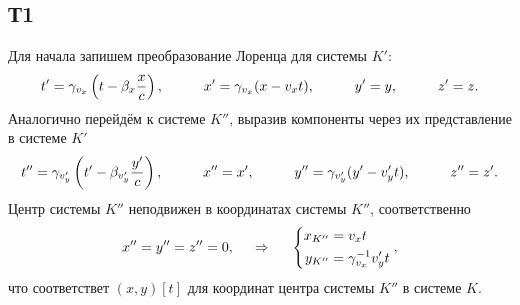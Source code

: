 \subsection*{Т1}

Для начала запишем преобразование Лоренца для системы $K'$:
\begin{equation*}
    t' = \gamma_{v_x} \left(t - \beta_x \frac{x}{c}\right)
    , \hspace{1 cm}
    x' = \gamma_{v_x} (x - v_x t)
    , \hspace{1 cm}
    y' = y
    , \hspace{1 cm}
    z' = z.
\end{equation*}
Аналогично перейдём к системе $K''$, выразив компоненты через их представление в системе $K'$
\begin{equation*}
    t'' = \gamma_{v_y'} \left(t' - \beta_{v_y'} \frac{y'}{c}\right),
    \hspace{1 cm}
    x'' = x', 
    \hspace{1 cm}
    y'' = \gamma_{v_y'} (y' - v_y' t),
    \hspace{1 cm}
    z'' = z'.
\end{equation*}
Центр системы $K''$ неподвижен в координатах системы $K''$, соответственно
\begin{equation*}
    x'' = y'' = z'' = 0,
    \hspace{0.5cm} \Rightarrow \hspace{0.5cm}
    \left\{\begin{aligned}
        x_{K''} &= v_x  t\\
        y_{K''} &= \gamma_{v_x}^{-1} v_y' t  
    \end{aligned}\right.
    ,
\end{equation*}
что соответствет $(x, y)[t]$ для координат центра системы $K''$ в системе $K$.

